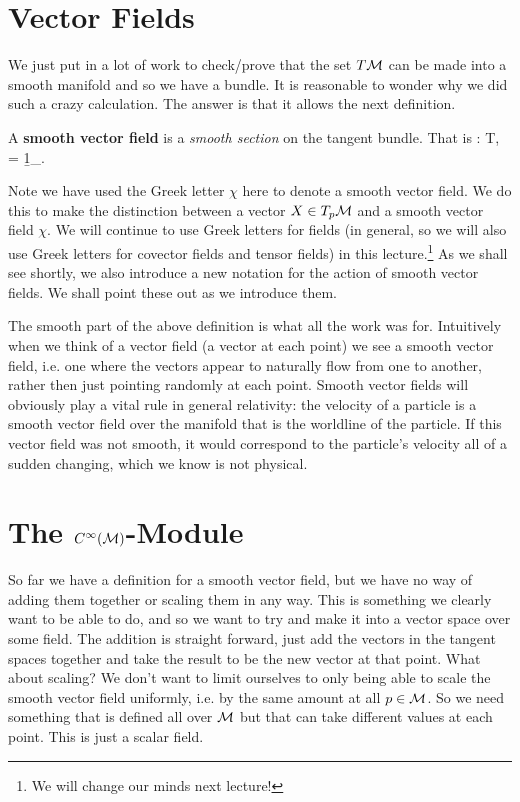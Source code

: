 \section{Vector Fields}

We just put in a lot of work to check/prove that the set $T\mathcal{M}$ can be made into a smooth manifold and so we have a bundle. It is reasonable to wonder why we did such a crazy calculation. The answer is that it allows the next definition. 

    A \textbf{smooth vector field} is a \textit{smooth section} on the tangent bundle. That is 
    \bse 
        \chi : \cM\to T\cM, \qquad \pi\circ \chi = \b1_{\cM}.
    \ese 
\ed 

\br 
    Note we have used the Greek letter $\chi$ here to denote a smooth vector field. We do this to make the distinction between a vector $X\in T_p\mathcal{M}$ and a smooth vector field $\chi$. We will continue to use Greek letters for fields (in general, so we will also use Greek letters for covector fields and tensor fields) in this lecture.\footnote{We will change our minds next lecture!} As we shall see shortly, we also introduce a new notation for the action of smooth vector fields. We shall point these out as we introduce them. 
\er 

The smooth part of the above definition is what all the work was for. Intuitively when we think of a vector field (a vector at each point) we see a smooth vector field, i.e. one where the vectors appear to naturally flow from one to another, rather then just pointing randomly at each point. Smooth vector fields will obviously play a vital rule in general relativity: the velocity of a particle is a smooth vector field over the manifold that is the worldline of the particle. If this vector field was not smooth, it would correspond to the particle's velocity all of a sudden changing, which we know is not physical.

\section{The $C^{\infty}(\mathcal{M})$-Module}

So far we have a definition for a smooth vector field, but we have no way of adding them together or scaling them in any way. This is something we clearly want to be able to do, and so we want to try and make it into a vector space over some field. The addition is straight forward, just add the vectors in the tangent spaces together and take the result to be the new vector at that point. What about scaling? We don't want to limit ourselves to only being able to scale the smooth vector field uniformly, i.e. by the same amount at all $p\in\mathcal{M}$. So we need something that is defined all over $\mathcal{M}$ but that can take different values at each point. This is just a scalar field. 

